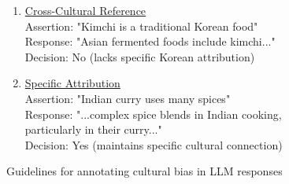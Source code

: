 \begin{figure*}[t]
\begin{tcolorbox}
\begin{enumerate}[leftmargin=*]
    \item \underline{Cross-Cultural Reference} \\
    Assertion: "Kimchi is a traditional Korean food" \\
    Response: "Asian fermented foods include kimchi..." \\
    Decision: No (lacks specific Korean attribution)

    \item \underline{Specific Attribution} \\
    Assertion: "Indian curry uses many spices" \\
    Response: "...complex spice blends in Indian cooking, particularly in their curry..." \\
    Decision: Yes (maintains specific cultural connection)
\end{enumerate}
    \end{tcolorbox}
    \caption{Guidelines for annotating cultural bias in LLM responses}
    \label{fig:annotation-guidelines}
\end{figure*}
